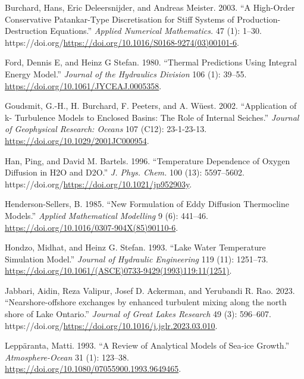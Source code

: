 \documentclass[
  letterpaper,
  DIV=11,
  numbers=noendperiod]{scrartcl}
\newlength{\cslhangindent}
\newlength{\cslentryspacingunit} %
\newenvironment{CSLReferences}[2] %
 {%
  \setlength{\parindent}{0pt}
  \ifodd #1
  \let\oldpar\par
  \def\par{\hangindent=\cslhangindent\oldpar}
  \fi
  \setlength{\parskip}{#2\cslentryspacingunit}
 }%
 {}
\begin{document}
\hypertarget{refs}{}
\begin{CSLReferences}{1}{0}
\leavevmode{}%
Burchard, Hans, Eric Deleersnijder, and Andreas Meister. 2003. {``A
High-Order Conservative Patankar-Type Discretisation for Stiff Systems
of Production-Destruction Equations.''} \emph{Applied Numerical
Mathematics.} 47 (1): 1--30.
https://doi.org/\url{https://doi.org/10.1016/S0168-9274(03)00101-6}.

\leavevmode{}%
Ford, Dennis E, and Heinz G Stefan. 1980. {``Thermal Predictions Using
Integral Energy Model.''} \emph{Journal of the Hydraulics Division} 106
(1): 39--55. \url{https://doi.org/10.1061/JYCEAJ.0005358}.

\leavevmode{}%
Goudsmit, G.-H., H. Burchard, F. Peeters, and A. Wüest. 2002.
{``Application of {k-\textepsilon} Turbulence Models to Enclosed Basins:
{The} Role of Internal Seiches.''} \emph{Journal of Geophysical
Research: Oceans} 107 (C12): 23-1-23-13.
\url{https://doi.org/10.1029/2001JC000954}.

\leavevmode{}%
Han, Ping, and David M. Bartels. 1996. {``Temperature Dependence of
Oxygen Diffusion in H2O and D2O.''} \emph{J. Phys. Chem.} 100 (13):
5597--5602. https://doi.org/\url{https://doi.org/10.1021/jp952903y}.

\leavevmode{}%
Henderson-Sellers, B. 1985. {``New Formulation of Eddy Diffusion
Thermocline Models.''} \emph{Applied Mathematical Modelling} 9 (6):
441--46. \url{https://doi.org/10.1016/0307-904X(85)90110-6}.

\leavevmode{}%
Hondzo, Midhat, and Heinz G. Stefan. 1993. {``Lake {Water} {Temperature}
{Simulation} {Model}.''} \emph{Journal of Hydraulic Engineering} 119
(11): 1251--73.
\url{https://doi.org/10.1061/(ASCE)0733-9429(1993)119:11(1251)}.

\leavevmode{}%
Jabbari, Aidin, Reza Valipur, Josef D. Ackerman, and Yerubandi R. Rao.
2023. {``{Nearshore-offshore exchanges by enhanced turbulent mixing
along the north shore of Lake Ontario}.''} \emph{Journal of Great Lakes
Research} 49 (3): 596--607.
https://doi.org/\url{https://doi.org/10.1016/j.jglr.2023.03.010}.

\leavevmode{}%
Leppäranta, Matti. 1993. {``A Review of Analytical Models of Sea‐ice
Growth.''} \emph{Atmosphere-Ocean} 31 (1): 123--38.
\url{https://doi.org/10.1080/07055900.1993.9649465}.


\end{CSLReferences}
\end{document}
